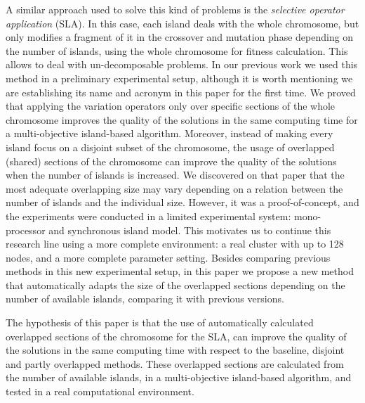 \documentclass[preprint]{elsarticle}
\begin{document}
A similar approach used to solve this kind of problems is the {\em selective operator application} (SLA). In this case, each island deals with the whole chromosome, but only modifies a fragment of it in the crossover and mutation phase depending on the number of islands, using the whole chromosome for fitness calculation. This allows to deal with un-decomposable problems.
In our previous work \citep{Garcia16hpmoon} we used this method in a preliminary experimental setup, although it is worth mentioning we are establishing its name and acronym in this paper for the first time.  We proved
that applying the variation operators only over specific sections of the whole chromosome improves the quality of the solutions in the same computing time for a multi-objective island-based algorithm.
Moreover, instead of making every island focus on a disjoint subset of the
chromosome, the usage of overlapped (shared) sections of the
chromosome 
can improve the quality of the solutions 
when the number of islands is increased. We discovered on that paper that the most
adequate overlapping size may vary depending on a relation between the
number of islands and the individual size. However, it was a proof-of-concept, and the experiments
were conducted in a limited experimental system: mono-processor and synchronous island model. This
motivates us to continue this research line using a more complete environment: a real cluster with up to 128 nodes, and a more complete parameter setting. Besides comparing previous methods in this new experimental setup, in this paper we propose
a new method that automatically adapts the size of the overlapped
sections depending on the number of available islands, comparing it with previous versions. 



The hypothesis of this paper is that the use of automatically calculated overlapped sections of the
chromosome for the SLA, can improve the
quality of the solutions in the same computing time with respect to
the baseline, disjoint and partly overlapped methods. 
These overlapped sections are calculated from the number of available islands, in a
multi-objective island-based algorithm, and tested in a real computational environment.
\end{document}

